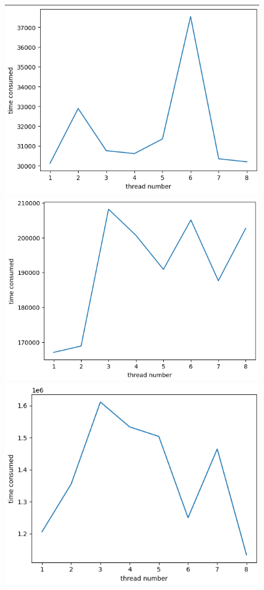 \documentclass[]{article}
\begin{document}
\begin{figure}[H]
    \includegraphics[scale = 0.6]{2023-03-25-13-58-09.png}
    \includegraphics[scale = 0.6]{2023-03-25-13-58-20.png}
    \includegraphics[scale = 0.6]{2023-03-25-13-58-35.png}

\end{figure}
\end{document}
